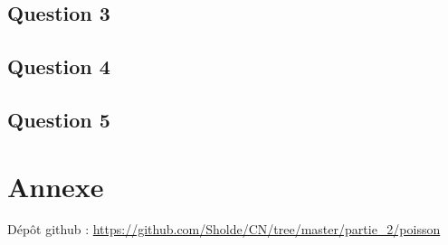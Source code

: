 \documentclass[11pt]{article}
\begin{document}
\subsection{Question 3}

\subsection{Question 4}

\subsection{Question 5}

\section{Annexe}

Dépôt github : \url{https://github.com/Sholde/CN/tree/master/partie_2/poisson}
\end{document}
